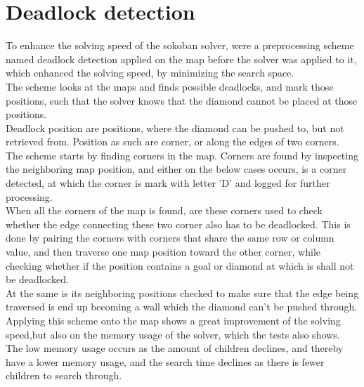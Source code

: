 \section{Deadlock detection}
To enhance the solving speed of the sokoban solver, were a preprocessing scheme named deadlock detection applied on the map before the solver was applied to it, which enhanced the solving speed,  by minimizing the search space. \\

The scheme looks at the maps and finds possible deadlocks, and mark those positions, such that the solver knows that the diamond cannot be placed at those positions. \\

Deadlock position are positions, where the diamond can be pushed to, but not retrieved from. Position as such are corner,  or along the edges of two corners.  \\



The scheme starts by finding corners in the map. Corners are found by inspecting the neighboring map position, and either on the below cases occurs, is a corner detected, at which the corner is mark with letter 'D' and logged for further processing. \\


When all the corners of the map is found, are these corners used to check whether the edge connecting these two corner also has to be deadlocked.   This is done by pairing the corners with corners that share the same row or column value, and then traverse one map position toward the other corner, while checking whether if the position contains a goal or diamond at which is shall not be deadlocked.\\

%

 At the same is its neighboring positions checked to make sure that the edge being traversed is end up becoming a wall which the diamond can't be pushed through. \\

 
 
 Applying this scheme onto the map shows a great improvement of the solving speed,but also on the memory usage of the solver,  which the tests also shows. The low memory usage occurs as the amount of children declines, and thereby have a lower memory usage, and the search time declines as there is fewer children to search through. \\

